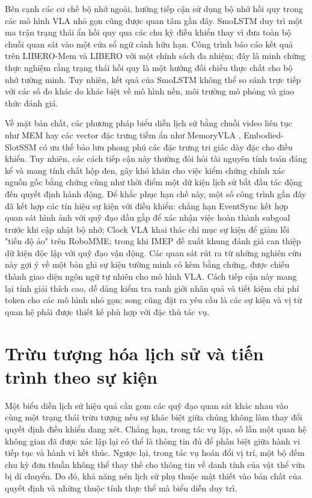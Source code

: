 Bên cạnh các cơ chế bộ nhớ ngoài, hướng tiếp cận sử dụng bộ nhớ hồi quy trong các mô hình VLA nhỏ gọn cũng được quan tâm gần đây. SmoLSTM \cite{smoLSTM2026} duy trì một ma trận trạng thái ẩn hồi quy qua các chu kỳ điều khiển thay vì đưa toàn bộ chuỗi quan sát vào một cửa sổ ngữ cảnh hữu hạn. Công trình báo cáo kết quả trên LIBERO-Mem và LIBERO với một chính sách đa nhiệm; đây là minh chứng thực nghiệm rằng trạng thái hồi quy là một hướng đối chiếu thực chất cho bộ nhớ tường minh. Tuy nhiên, kết quả của SmoLSTM không thể so sánh trực tiếp với các số đo khác do khác biệt về mô hình nền, môi trường mô phỏng và giao thức đánh giá.

Về mặt bản chất, các phương pháp biểu diễn lịch sử bằng chuỗi video liên tục như MEM \cite{mem2026} hay các vector đặc trưng tiềm ẩn như MemoryVLA \cite{memoryvla2026}, Embodied-SlotSSM \cite{liberomem2025} có ưu thế bảo lưu phong phú các đặc trưng tri giác dày đặc cho điều khiển. Tuy nhiên, các cách tiếp cận này thường đòi hỏi tài nguyên tính toán đáng kể và mang tính chất hộp đen, gây khó khăn cho việc kiểm chứng chính xác nguồn gốc bằng chứng cũng như thời điểm một dữ kiện lịch sử bắt đầu tác động đến quyết định hành động. Để khắc phục hạn chế này, một số công trình gần đây đã kết hợp các tín hiệu sự kiện với điều khiển: chẳng hạn EventSync \cite{eventsync2026} kết hợp quan sát hình ảnh với quỹ đạo đầu gắp để xác nhận việc hoàn thành subgoal trước khi cập nhật bộ nhớ; Clock VLA \cite{clockvla2026} khai thác chỉ mục sự kiện để giảm lỗi "tiến độ ảo" trên RoboMME; trong khi IMEP \cite{imep2026} đề xuất khung đánh giá can thiệp dữ kiện độc lập với quỹ đạo vận động. Các quan sát rút ra từ những nghiên cứu này gợi ý về một bản ghi sự kiện tường minh có kèm bằng chứng, được chiếu thành giao diện ngôn ngữ tự nhiên cho mô hình VLA. Cách tiếp cận này mang lại tính giải thích cao, dễ dàng kiểm tra ranh giới nhân quả và tiết kiệm chi phí token cho các mô hình nhỏ gọn; song cũng đặt ra yêu cầu là các sự kiện và vị từ quan hệ phải được thiết kế phù hợp với đặc thù tác vụ.

\section{Trừu tượng hóa lịch sử và tiến trình theo sự kiện}

Một biểu diễn lịch sử hiệu quả cần gom các quỹ đạo quan sát khác nhau vào cùng một trạng thái trừu tượng nếu sự khác biệt giữa chúng không làm thay đổi quyết định điều khiển đang xét. Chẳng hạn, trong tác vụ lặp, số lần một quan hệ không gian đã được xác lập lại có thể là thông tin đủ để phân biệt giữa hành vi tiếp tục và hành vi kết thúc. Ngược lại, trong tác vụ hoán đổi vị trí, một bộ đếm chu kỳ đơn thuần không thể thay thế cho thông tin về danh tính của vật thể vừa bị di chuyển. Do đó, khả năng nén lịch sử phụ thuộc mật thiết vào bản chất của quyết định và những thuộc tính thực thể mà biểu diễn duy trì.

